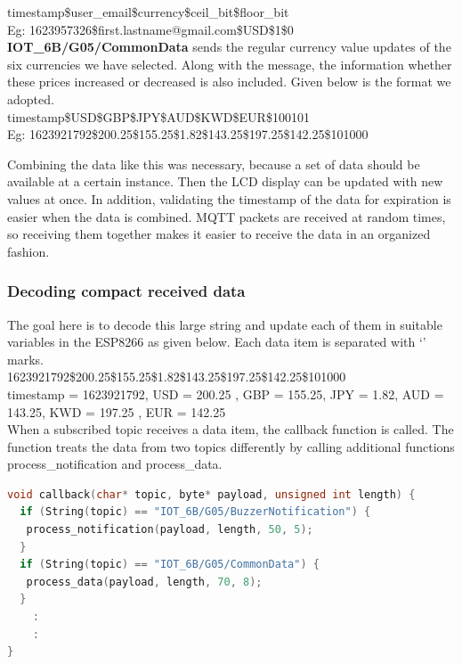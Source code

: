 timestamp\$user\_email\$currency\$ceil\_bit\$floor\_bit\\

Eg: 1623957326\$first.lastname@gmail.com\$USD\$1\$0\\


\textbf{IOT\_6B/G05/CommonData} sends the regular currency value updates of the six currencies we have selected. Along with the message, the information whether these prices increased or decreased is also included. Given below is the format we adopted.\\

timestamp\$USD\$GBP\$JPY\$AUD\$KWD\$EUR\$100101\\

Eg: 1623921792\$200.25\$155.25\$1.82\$143.25\$197.25\$142.25\$101000





Combining the data like this was necessary, because a set of data should be available at a certain instance. Then the LCD display can be updated with new values at once. In addition, validating the timestamp of the data for expiration is easier when the data is combined. MQTT packets are received at random times, so receiving them together makes it easier to receive the data in an organized fashion.

\subsubsection{Decoding compact received data}

The goal here is to decode this large string and update each of them in suitable variables in the ESP8266 as given below. Each data item is separated with ‘\textdollar’ marks.\\


1623921792\$200.25\$155.25\$1.82\$143.25\$197.25\$142.25\$101000\\


timestamp = 1623921792, USD = 200.25 , GBP = 155.25, JPY = 1.82, AUD = 143.25, KWD = 197.25 , EUR = 142.25\\

When a subscribed topic receives a data item, the callback function is called. The function treats the data from two topics differently by calling additional functions process\_notification and process\_data.\\

\begin{lstlisting}[language=C++]
void callback(char* topic, byte* payload, unsigned int length) {
  if (String(topic) == "IOT_6B/G05/BuzzerNotification") {
   process_notification(payload, length, 50, 5);
  }
  if (String(topic) == "IOT_6B/G05/CommonData") {
   process_data(payload, length, 70, 8);
  }
	:
	:
}
\end{lstlisting}


